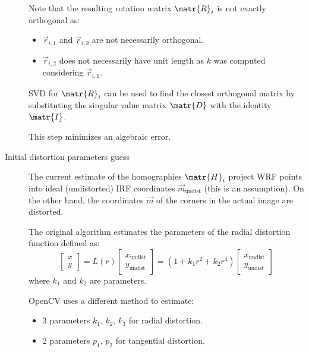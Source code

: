 \begin{description}
        Note that the resulting rotation matrix $\matr{R}_i$ is not exactly orthogonal as:
        \begin{itemize}
            \item $\vec{r}_{i,1}$ and $\vec{r}_{i,2}$ are not necessarily orthogonal.
            \item $\vec{r}_{i,2}$ does not necessarily have unit length as $k$ was computed considering $\vec{r}_{i,1}$.
        \end{itemize}
        SVD for $\matr{R}_i$ can be used to find the closest orthogonal matrix by substituting the singular value matrix $\matr{D}$ with the identity $\matr{I}$.

        \begin{remark}
            This step minimizes an algebraic error.
        \end{remark}

    \item[Initial distortion parameters guess]
        The current estimate of the homographies $\matr{H}_i$ project WRF points into ideal (undistorted) IRF coordinates $\vec{m}_\text{undist}$ (this is an assumption).
        On the other hand, the coordinates $\vec{m}$ of the corners in the actual image are distorted.

        The original algorithm estimates the parameters of the radial distortion function defined as:
        \[
            \begin{bmatrix} x \\ y \end{bmatrix} = L(r) \begin{bmatrix} x_\text{undist} \\ y_\text{undist} \end{bmatrix} =
                (1 + k_1r^2 + k_2r^4) \begin{bmatrix} x_\text{undist} \\ y_\text{undist} \end{bmatrix}
        \]
        where $k_1$ and $k_2$ are parameters.

        \begin{remark}
            OpenCV uses a different method to estimate:
            \begin{itemize}
                \item 3 parameters $k_1$, $k_2$, $k_3$ for radial distortion.
                \item 2 parameters $p_1$, $p_2$ for tangential distortion.
            \end{itemize}
        \end{remark}


\end{description}
